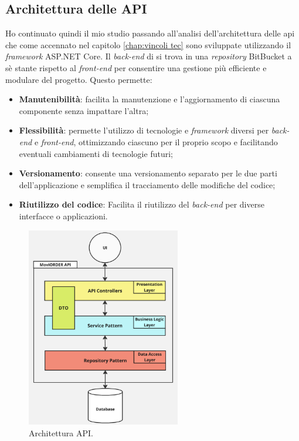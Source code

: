 \subsection{Architettura delle API}
Ho continuato quindi il mio studio passando all'analisi dell'architettura delle \gls{api} che come accennato nel capitolo 
\ref{chap:vincoli tec} sono sviluppate utilizzando il \textit{framework} ASP.NET Core. 
Il \textit{back-end} di {\movi} si trova in una \textit{repository} BitBucket a sè stante rispetto al \textit{front-end} per consentire 
una gestione più efficiente e modulare del progetto. Questo permette: 
\begin{itemize}
    \item \textbf{Manutenibilità}: facilita la manutenzione e l'aggiornamento di ciascuna componente senza impattare l'altra;
    \item \textbf{Flessibilità}: permette l'utilizzo di tecnologie e \textit{framework} diversi per \textit{back-end} e 
          \textit{front-end}, ottimizzando ciascuno per il proprio scopo e facilitando eventuali cambiamenti di tecnologie futuri;
    \item \textbf{Versionamento}: consente una versionamento separato per le due parti dell'applicazione e semplifica il 
          tracciamento delle modifiche del codice;
    \item \textbf{Riutilizzo del codice}: Facilita il riutilizzo del \textit{back-end} per diverse interfacce o applicazioni.
\end{itemize}

\begin{figure}[H]
    \centering
    \includegraphics[width=0.6\textwidth]{img/repository-service.png}
    \caption{Architettura API.}
    \label{fig:repository-service}
\end{figure}

